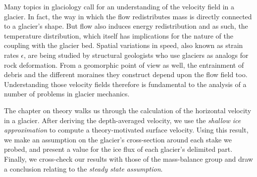 \documentclass[11pt]{report}
\begin{document}
\newcommand{\fraction}[2]{\raisebox{0.5ex}{#1} \slash \raisebox{-0.5ex}{#2}}

Many topics in glaciology call for an understanding of the velocity field in a glacier. In fact, the way in which the flow redistributes mass is directly connected to a glacier's shape. But flow also induces energy redistribution and as such, the temperature distribution, which itself has implications for the nature of the coupling with the glacier bed. Spatial variations in speed, also known as strain rates $\epsilon$, are being studied by structural geologists who use glaciers as analogs for rock deformation. From a geomorphic point of view as well, the entrainment of debris and the different moraines they construct depend upon the flow field too. Understanding those velocity fields therefore is fundamental to the analysis of a number of problems in glacier mechanics.


The chapter on theory walks us through the calculation of the horizontal velocity in a glacier. After deriving the depth-averaged velocity, we use the \textit{shallow ice approximation} to compute a theory-motivated surface velocity. Using this result, we make an assumption on the glacier's cross-section around each stake we probed, and present a value for the ice flux of each glacier's delimited part. Finally, we cross-check our results with those of the mass-balance group and draw a conclusion relating to the \textit{steady state assumption}.
\end{document}
